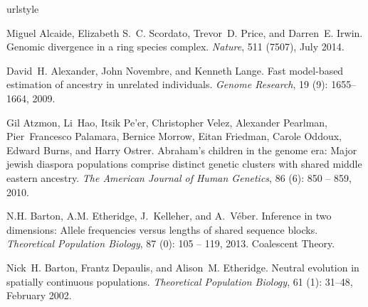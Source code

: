 \documentclass[10pt,letterpaper]{article}
\begin{document}
\nolinenumbers

%
%
% 
\begin{thebibliography}{80}
\providecommand{\natexlab}[1]{#1}
\providecommand{\url}[1]{\texttt{#1}}
\expandafter\ifx\csname urlstyle\endcsname\relax
  \providecommand{\doi}[1]{doi: #1}\else
  \providecommand{\doi}{doi: \begingroup \urlstyle{rm}\Url}\fi

Miguel Alcaide, Elizabeth S.~C. Scordato, Trevor~D. Price, and Darren~E. Irwin.
\newblock Genomic divergence in a ring species complex.
\newblock \emph{Nature}, 511 (7507), July 2014.

David~H. Alexander, John Novembre, and Kenneth Lange.
\newblock Fast model-based estimation of ancestry in unrelated individuals.
\newblock \emph{Genome Research}, 19 (9): 1655--1664, 2009.

Gil Atzmon, Li~Hao, Itsik Pe'er, Christopher Velez, Alexander Pearlman,
  Pier~Francesco Palamara, Bernice Morrow, Eitan Friedman, Carole Oddoux,
  Edward Burns, and Harry Ostrer.
\newblock Abraham's children in the genome era: Major jewish diaspora
  populations comprise distinct genetic clusters with shared middle eastern
  ancestry.
\newblock \emph{The American Journal of Human Genetics}, 86
  (6): 850 -- 859, 2010.

N.H. Barton, A.M. Etheridge, J.~Kelleher, and A.~Véber.
\newblock Inference in two dimensions: Allele frequencies versus lengths of
  shared sequence blocks.
\newblock \emph{Theoretical Population Biology}, 87 (0): 105
  -- 119, 2013.
\newblock Coalescent Theory.

Nick~H. Barton, Frantz Depaulis, and Alison~M. Etheridge.
\newblock Neutral evolution in spatially continuous populations.
\newblock \emph{Theoretical Population Biology}, 61 (1):
  31--48, February 2002.


\end{thebibliography}
\end{document}
